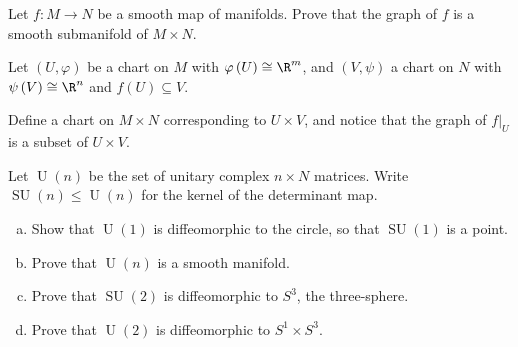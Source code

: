 \documentclass[10pt]{mypackage}
\begin{document}
\RaggedRight
\begin{problem}[Problem 1]
  Let $f\colon M\rightarrow N$ be a smooth map of manifolds. Prove that the graph of $f$ is a smooth submanifold of $M\times N$.
\end{problem}
\begin{solution}
  Let $\left( U,\varphi \right)$ be a chart on $M$ with $\varphi\left( U \right)\cong \R^{m}$, and $\left( V,\psi \right)$ a chart on $N$ with $\psi\left( V \right)\cong \R^{n}$ and $f\left( U \right)\subseteq V$.\newline

  Define a chart on $M\times N$ corresponding to $U\times V$, and notice that the graph of $f|_{U}$ is a subset of $U\times V$.
\end{solution}
\begin{problem}[Problem 2]
  Let $\operatorname{U}(n)$ be the set of unitary complex $n\times N$ matrices. Write $\operatorname{SU}\left( n \right)\leq \operatorname{U}(n)$ for the kernel of the determinant map.
  \begin{enumerate}[(a)]
    \item Show that $\operatorname{U}(1)$ is diffeomorphic to the circle, so that $\operatorname{SU}(1)$ is a point.
    \item Prove that $\operatorname{U}(n)$ is a smooth manifold.
    \item Prove that $\operatorname{SU}(2)$ is diffeomorphic to $S^{3}$, the three-sphere.
    \item Prove that $\operatorname{U}(2)$ is diffeomorphic to $S^{1}\times S^{3}$.
  \end{enumerate}
\end{problem}
\end{document}
